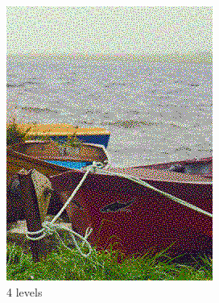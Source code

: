 \documentclass[]{article}
\begin{document}
\clearpage
\begin{figure}[!htbp]
	\centering
	\begin{minipage}[b]{0.4\textwidth}
		\includegraphics[width=\textwidth]{img/dithering4}
		\caption{4 levels}
	\end{minipage}
	\hfill
	\begin{minipage}[b]{0.4\textwidth}

\end{minipage}
\end{figure}
\end{document}
